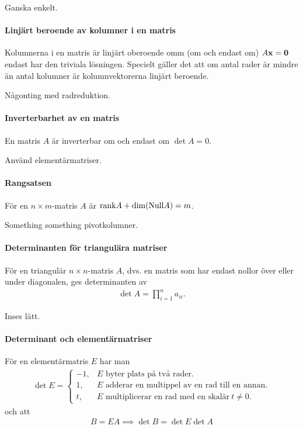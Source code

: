 \proof
Ganska enkelt.

\paragraph{Linjärt beroende av kolumner i en matris}
Kolumnerna i en matris är linjärt oberoende omm (om och endast om) $A\vect{x} = \vect{0}$ endast har den triviala lösningen. Specielt gäller det att om antal rader är mindre än antal kolumner är kolumnvektorerna linjärt beroende.

\proof
Någonting med radreduktion.

\paragraph{Inverterbarhet av en matris}
En matris $A$ är inverterbar om och endast om $\det A = 0$.

\proof
Använd elementärmatriser.

\paragraph{Rangsatsen}
För en $n\times m$-matris $A$ är $\text{rank} A + \text{dim}(\text{Null} A) = m$.

\proof
Something something pivotkolumner.

\paragraph{Determinanten för triangulära matriser}
För en triangulär $n\times n$-matris $A$, dvs. en matris som har endast nollor över eller under diagonalen, ges determinanten av
\begin{align*}
	\det{A} = \prod\limits_{i = 1}^{n} a_{ii}.
\end{align*}

\proof
Inses lätt.

\paragraph{Determinant och elementärmatriser}
För en elementärmatris $E$ har man
\begin{align*}
	\det{E} =
	\begin{cases}
		-1, &E\text{ byter plats på två rader.} \\
		1,  &E\text{ adderar en multippel av en rad till en annan.} \\
		t,  &E\text{ multiplicerar en rad med en skalär}~t\neq 0.
	\end{cases}
\end{align*}
och att
\begin{align*}
	B = EA \implies \det{B} = \det{E}\det{A}
\end{align*}

